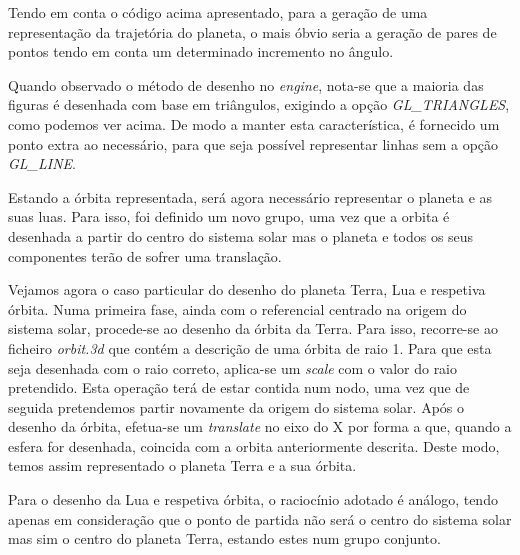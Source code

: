\documentclass[a4paper]{article}
\begin{document}
\par Tendo em conta o código acima apresentado, para a geração de uma representação da trajetória do planeta, o mais óbvio seria a geração de pares de pontos tendo em conta um determinado incremento no ângulo.

\par Quando observado o método de desenho no \emph{engine}, nota-se que a maioria das figuras é desenhada com base em triângulos, exigindo a opção \emph{GL\_TRIANGLES}, como podemos ver acima. De modo a manter esta característica, é fornecido um ponto extra ao necessário, para que seja possível representar linhas sem a opção \emph{GL\_LINE}.

\par Estando a órbita representada, será agora necessário representar o planeta e as suas luas. Para isso, foi definido um novo grupo, uma vez que a orbita é desenhada a partir do centro do sistema solar mas o planeta e todos os seus componentes terão de sofrer uma translação.

\par Vejamos agora o caso particular do desenho do planeta Terra, Lua e respetiva órbita. Numa primeira fase, ainda com o referencial centrado na origem do sistema solar, procede-se ao desenho da órbita da Terra. Para isso, recorre-se ao ficheiro \textit{orbit.3d} que contém a descrição de uma órbita de raio 1. Para que esta seja desenhada com o raio correto, aplica-se um \emph{scale} com o valor do raio pretendido. Esta operação terá de estar contida num nodo, uma vez que de seguida pretendemos partir novamente da origem do sistema solar. Após o desenho da órbita, efetua-se um \emph{translate} no eixo do X por forma a que, quando a esfera for desenhada, coincida com a orbita anteriormente descrita. Deste modo, temos assim representado o planeta Terra e a sua órbita.
\par Para o desenho da Lua e respetiva órbita, o raciocínio adotado é análogo, tendo apenas em consideração que o ponto de partida não será o centro do sistema solar mas sim o centro do planeta Terra, estando estes num grupo conjunto.
\end{document}
